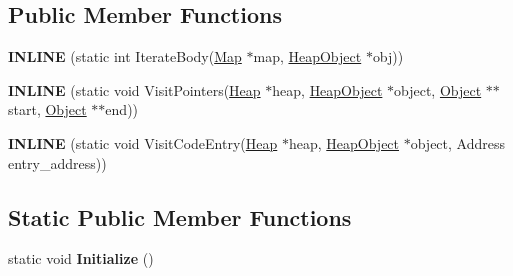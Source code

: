 \subsection*{Public Member Functions}
\begin{DoxyCompactItemize}
\item 
{\bfseries I\+N\+L\+I\+NE} (static int Iterate\+Body(\hyperlink{classv8_1_1internal_1_1_map}{Map} $\ast$map, \hyperlink{classv8_1_1internal_1_1_heap_object}{Heap\+Object} $\ast$obj))\hypertarget{classv8_1_1internal_1_1_static_new_space_visitor_a058948665e17d6ea3626b73060fb0bc7}{}\label{classv8_1_1internal_1_1_static_new_space_visitor_a058948665e17d6ea3626b73060fb0bc7}

\item 
{\bfseries I\+N\+L\+I\+NE} (static void Visit\+Pointers(\hyperlink{classv8_1_1internal_1_1_heap}{Heap} $\ast$heap, \hyperlink{classv8_1_1internal_1_1_heap_object}{Heap\+Object} $\ast$object,                                                                                                                                   \hyperlink{classv8_1_1internal_1_1_object}{Object} $\ast$$\ast$start, \hyperlink{classv8_1_1internal_1_1_object}{Object} $\ast$$\ast$end))\hypertarget{classv8_1_1internal_1_1_static_new_space_visitor_ad9dcc8fbc25bd14ee754a8f0ccb0d6c2}{}\label{classv8_1_1internal_1_1_static_new_space_visitor_ad9dcc8fbc25bd14ee754a8f0ccb0d6c2}

\item 
{\bfseries I\+N\+L\+I\+NE} (static void Visit\+Code\+Entry(\hyperlink{classv8_1_1internal_1_1_heap}{Heap} $\ast$heap, \hyperlink{classv8_1_1internal_1_1_heap_object}{Heap\+Object} $\ast$object,                                                                                                                                       Address entry\+\_\+address))\hypertarget{classv8_1_1internal_1_1_static_new_space_visitor_a5e3969a31021eeaa33d8d7e863ce5bc0}{}\label{classv8_1_1internal_1_1_static_new_space_visitor_a5e3969a31021eeaa33d8d7e863ce5bc0}

\end{DoxyCompactItemize}
\subsection*{Static Public Member Functions}
\begin{DoxyCompactItemize}
\item 
static void {\bfseries Initialize} ()\hypertarget{classv8_1_1internal_1_1_static_new_space_visitor_ac04052efdf8d9d8bf030f68fd06251d5}{}\label{classv8_1_1internal_1_1_static_new_space_visitor_ac04052efdf8d9d8bf030f68fd06251d5}

\end{DoxyCompactItemize}
